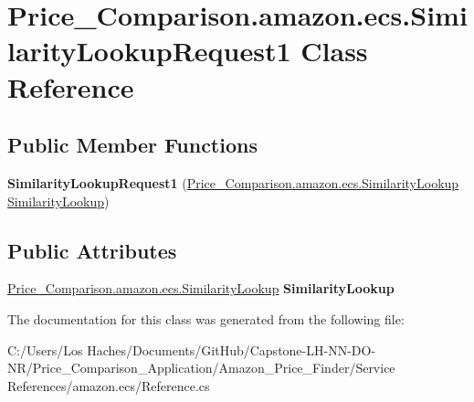 \hypertarget{class_price___comparison_1_1amazon_1_1ecs_1_1_similarity_lookup_request1}{\section{Price\-\_\-\-Comparison.\-amazon.\-ecs.\-Similarity\-Lookup\-Request1 Class Reference}
\label{class_price___comparison_1_1amazon_1_1ecs_1_1_similarity_lookup_request1}
}
\subsection*{Public Member Functions}
\begin{DoxyCompactItemize}
\item 
\hypertarget{class_price___comparison_1_1amazon_1_1ecs_1_1_similarity_lookup_request1_a3bf6fd972104e58b95af684777dfbd36}{{\bfseries Similarity\-Lookup\-Request1} (\hyperlink{class_price___comparison_1_1amazon_1_1ecs_1_1_similarity_lookup}{Price\-\_\-\-Comparison.\-amazon.\-ecs.\-Similarity\-Lookup} \hyperlink{class_price___comparison_1_1amazon_1_1ecs_1_1_similarity_lookup}{Similarity\-Lookup})}\label{class_price___comparison_1_1amazon_1_1ecs_1_1_similarity_lookup_request1_a3bf6fd972104e58b95af684777dfbd36}

\end{DoxyCompactItemize}
\subsection*{Public Attributes}
\begin{DoxyCompactItemize}
\item 
\hypertarget{class_price___comparison_1_1amazon_1_1ecs_1_1_similarity_lookup_request1_a24e279ef29fdb051fb42c77012ba11c0}{\hyperlink{class_price___comparison_1_1amazon_1_1ecs_1_1_similarity_lookup}{Price\-\_\-\-Comparison.\-amazon.\-ecs.\-Similarity\-Lookup} {\bfseries Similarity\-Lookup}}\label{class_price___comparison_1_1amazon_1_1ecs_1_1_similarity_lookup_request1_a24e279ef29fdb051fb42c77012ba11c0}

\end{DoxyCompactItemize}


The documentation for this class was generated from the following file\-:\begin{DoxyCompactItemize}
\item 
C\-:/\-Users/\-Los Haches/\-Documents/\-Git\-Hub/\-Capstone-\/\-L\-H-\/\-N\-N-\/\-D\-O-\/\-N\-R/\-Price\-\_\-\-Comparison\-\_\-\-Application/\-Amazon\-\_\-\-Price\-\_\-\-Finder/\-Service References/amazon.\-ecs/Reference.\-cs\end{DoxyCompactItemize}
